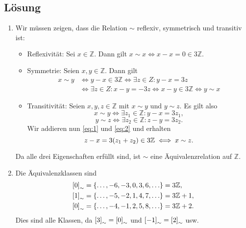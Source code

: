 \documentclass[german,12pt]{homework}
\newcommand{\ZZ}{\mathbb{Z}}
\DeclarePairedDelimiter{\enbrace}{(}{)}
\DeclarePairedDelimiter{\benbrace}{[}{]}
\DeclarePairedDelimiter{\penbrace}{\{}{\}}
\begin{document}
    \subsection*{Lösung}
    \begin{enumerate}
        \item Wir müssen zeigen, dass die Relation \(\sim\) reflexiv,
        symmetrisch und transitiv ist:
        \begin{itemize}
            \item Reflexivität: Sei \(x \in \ZZ\). Dann gilt \(x \sim x \iff x
            - x = 0 \in 3\ZZ\).
            \item Symmetrie: Seien \(x, y \in \ZZ\). Dann gilt
            \begin{align*}
                x \sim y &\iff y - x \in 3\ZZ \iff \exists{z \in Z}: y - x =
                3z\\
                &\iff\exists{z \in Z}: x - y = -3z \iff x - y \in 3\ZZ \iff y
                \sim x
            \end{align*}
            \item Transitivität: Seien \(x, y, z \in \ZZ\) mit \(x \sim y\) und
            \(y \sim z\). Es gilt also
            \begin{equation}\label{eq:1}
                x \sim y \iff \exists{z_1 \in \ZZ}: y - x = 3z_1,
            \end{equation}
            \begin{equation}\label{eq:2}
                y \sim z \iff \exists{z_2 \in \ZZ}: z - y = 3z_2.
            \end{equation}
            Wir addieren nun \eqref{eq:1} und \eqref{eq:2} und erhalten
            \[z - x = 3\enbrace*{z_1 + z_2} \in 3\ZZ \iff x \sim z.\]
        \end{itemize}
        Da alle drei Eigenschaften erfüllt sind, ist \(\sim\) eine
        Äquivalenzrelation auf \(\ZZ\).
        \item Die Äquivalenzklassen sind
        \begin{align*}
            \benbrace*{0}_\sim &= \penbrace*{\ldots, -6, -3, 0, 3, 6, \ldots} =
            3\ZZ,\\
            \benbrace*{1}_\sim &= \penbrace*{\ldots, -5, -2, 1, 4, 7, \ldots} =
            3\ZZ + 1,\\
            \benbrace*{0}_\sim &= \penbrace*{\ldots, -4, -1, 2, 5, 8, \ldots} =
            3\ZZ + 2.
        \end{align*}
        Dies sind alle Klassen, da \(\benbrace*{3}_\sim = \benbrace*{0}_\sim\)
        und \(\benbrace*{-1}_\sim = \benbrace*{2}_\sim\) usw.
    \end{enumerate}
\end{document}
